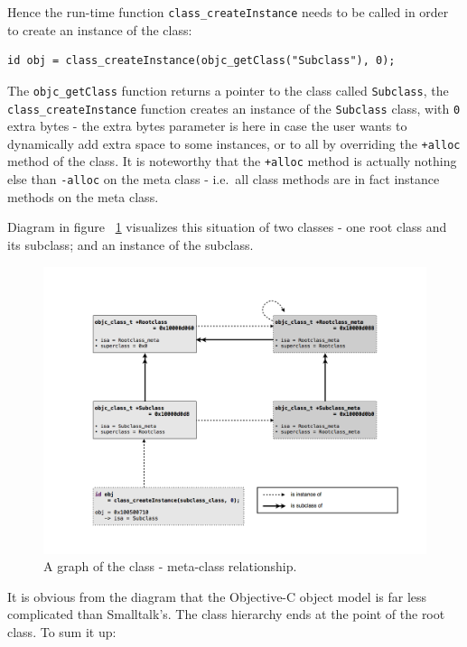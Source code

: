 Hence the run-time function \verb=class_createInstance= needs to be called in order to create an instance of the class:

\begin{verbatim}
id obj = class_createInstance(objc_getClass("Subclass"), 0);
\end{verbatim}

The \verb=objc_getClass= function returns a pointer to the class called \verb=Subclass=, the \verb=class_createInstance= function creates an instance of the \verb=Subclass= class, with \verb=0= extra bytes - the extra bytes parameter is here in case the user wants to dynamically add extra space to some instances, or to all by overriding the \verb=+alloc= method of the class. It is noteworthy that the \verb=+alloc= method is actually nothing else than \verb=-alloc= on the meta class - i.e.\ all class methods are in fact instance methods on the meta class.


Diagram in figure ~\ref{fig:class_metaclass_graph} visualizes this situation of two classes - one root class and its subclass; and an instance of the subclass.

\begin{figure}[H] 
\includegraphics[width=\textwidth]{img/metaclass_graph.png}
  \centering{}
  \caption{A graph of the class - meta-class relationship.}
  \label{fig:class_metaclass_graph}
\end{figure}

It is obvious from the diagram that the Objective-C object model is far less complicated than Smalltalk's. The class hierarchy ends at the point of the root class. To sum it up:

